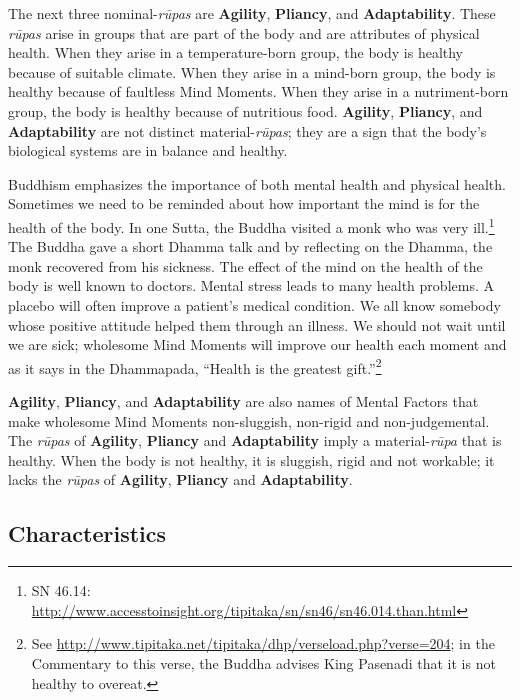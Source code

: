
The next three nominal-\textit{rūpas} are \textbf{Agility}, \textbf{Pliancy}, and \textbf{Adaptability}. These \textit{rūpas} arise in groups that are part of the body and are attributes of physical health. When they arise in a temperature-born group, the body is healthy because of suitable climate. When they arise in a mind-born group, the body is healthy because of faultless Mind Moments. When they arise in a nutriment-born group, the body is healthy because of nutritious food. \textbf{Agility}, \textbf{Pliancy}, and \textbf{Adaptability} are not distinct material-\textit{rūpas}; they are a sign that the body’s biological systems are in balance and healthy.

Buddhism emphasizes the importance of both mental health and physical health. Sometimes we need to be reminded about how important the mind is for the health of the body. In one Sutta, the Buddha visited a monk who was very ill.\footnote{SN 46.14: \url{http://www.accesstoinsight.org/tipitaka/sn/sn46/sn46.014.than.html}} The Buddha gave a short Dhamma talk and by reflecting on the Dhamma, the monk recovered from his sickness. The effect of the mind on the health of the body is well known to doctors. Mental stress leads to many health problems. A placebo will often improve a patient’s medical condition. We all know somebody whose positive attitude helped them through an illness. We should not wait until we are sick; wholesome Mind Moments will improve our health each moment and as it says in the Dhammapada, “Health is the greatest gift.”\footnote{See \url{http://www.tipitaka.net/tipitaka/dhp/verseload.php?verse=204}; in the Commentary to this verse, the Buddha advises King Pasenadi that it is not healthy to overeat.}

\textbf{Agility}, \textbf{Pliancy}, and \textbf{Adaptability} are also names of Mental Factors that make wholesome Mind Moments non-sluggish, non-rigid and non-judgemental. The \textit{rūpas} of \textbf{Agility}, \textbf{Pliancy} and \textbf{Adaptability} imply a material-\textit{rūpa} that is healthy. When the body is not healthy, it is sluggish, rigid and not workable; it lacks the \textit{rūpas} of \textbf{Agility}, \textbf{Pliancy} and \textbf{Adaptability}.

\subsection*{Characteristics}


